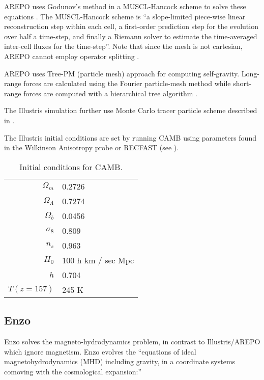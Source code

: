 \textsc{AREPO} uses Godunov's method in a MUSCL-Hancock scheme to solve these equations \cite{springel_e_2010}. The MUSCL-Hancock scheme is ``a slope-limited piece-wise linear reconstruction step within each cell, a first-order prediction step for the evolution over half a time-step, and finally a Riemann solver to estimate the time-averaged inter-cell fluxes for the time-step''\cite{van_leer_relation_1984,van_leer_upwind_2012}. Note that since the mesh is not cartesian, \textsc{AREPO} cannot employ operator splitting \cite{strang_construction_1968}.

\textsc{AREPO} uses Tree-PM (particle mesh) approach for computing self-gravity. Long-range forces are calculated using the Fourier particle-mesh method while short-range forces are computed with a hierarchical tree algorithm \cite{nelson_illustris_2015}.

The Illustris simulation further use Monte Carlo tracer particle scheme described in \cite{genel_following_2013}.

The Illustris initial conditions are set by running CAMB \cite{seljak_line--sight_1996} using parameters found in the Wilkinson Anisotropy probe \cite{hinshaw_nine-year_2013} or RECFAST \cite{seager_new_1999} (see ).

\begin{table}[h]
\begin{tabular}{rl}
  \toprule
  \(\Omega_m\) & 0.2726 \\
  \(\Omega_\Lambda\) & 0.7274 \\
  \(\Omega_b\) & 0.0456 \\
  \(\sigma_8\) & 0.809 \\
  \(n_s\) & 0.963 \\
  \(H_0\) & 100 h km / sec Mpc \\
  \(h\) & 0.704 \\
  \(T(z = 157)\) & 245 K \\
  \bottomrule
\end{tabular}
\caption{Initial conditions for CAMB.}
\label{initial-conditions}
\end{table}

\subsection*{Enzo}

Enzo \cite{oshea_introducing_2004,bryan_enzo_2014} solves the magneto-hydrodynamics problem, in contrast to Illustris/\textsc{AREPO} which ignore magnetism. Enzo evolves the ``equations of ideal magnetohydrodynamics (MHD) including gravity, in a coordinate systems comoving with the cosmological expansion:''

